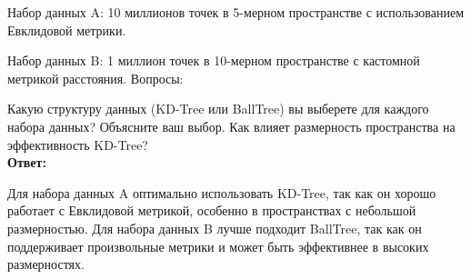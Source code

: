   Набор данных A: 10 миллионов точек в 5-мерном пространстве с использованием Евклидовой метрики.
  
  Набор данных B: 1 миллион точек в 10-мерном пространстве с кастомной метрикой расстояния.
Вопросы:

Какую структуру данных (KD-Tree или BallTree) вы выберете для каждого набора данных? Объясните ваш выбор.
Как влияет размерность пространства на эффективность KD-Tree?\\
\textbf{Ответ:}

Для набора данных A оптимально использовать KD-Tree, так как он хорошо работает с Евклидовой метрикой, особенно в пространствах с небольшой размерностью.
Для набора данных B лучше подходит BallTree, так как он поддерживает произвольные метрики и может быть эффективнее в высоких размерностях.  


